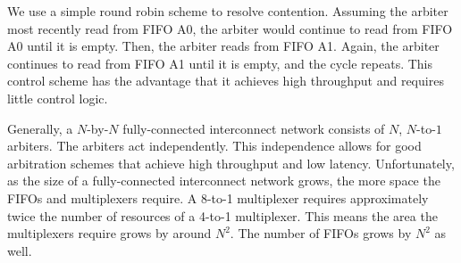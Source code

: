 We use a simple round robin scheme to resolve contention. Assuming the arbiter most recently read from FIFO A0, the arbiter would continue to read from FIFO A0 until it is empty. Then, the arbiter reads from FIFO A1. Again, the arbiter continues to read from FIFO A1 until it is empty, and the cycle repeats. This control scheme has the advantage that it achieves high throughput and requires little control logic.

Generally, a $N$-by-$N$ fully-connected interconnect network consists of $N$, $N$-to-$1$ arbiters. The arbiters act independently. This independence allows for good arbitration schemes that achieve high throughput and low latency.
Unfortunately, as the size of a fully-connected interconnect network grows, the more space the FIFOs and multiplexers require. A 8-to-1 multiplexer requires approximately twice the number of resources of a 4-to-1 multiplexer. This means the area the multiplexers require grows by around $N^2$. The number of FIFOs grows by $N^2$ as well.

%    


